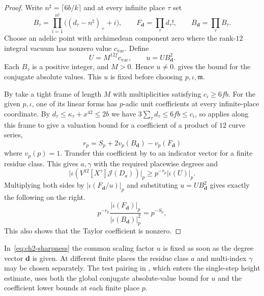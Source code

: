 \begin{proof}
Write $n^\sharp=\lceil6b/k\rceil$ and at every infinite place $\tau$ set
\[
 B_\tau=\prod_{i=1}^{n^\sharp}\bigl((d_\tau-n^\sharp)_++i\bigr),
 \qquad
 F_{\boldsymbol d}=\prod_\tau d_\tau!,
 \qquad B_{\boldsymbol d}=\prod_\tau B_\tau .
\]
Choose an adelic point with archimedean component zero where the rank-$12$ integral vacuum has nonzero value $c_{\mathrm{vac}}$. Define
\[
 U=M^{12f}c_{\mathrm{vac}},\qquad u=U B_{\boldsymbol d}^2 .
\]
Each $B_\tau$ is a positive integer, and $M>0$. Hence $u\ne0$.  gives the bound for the conjugate absolute values. This $u$ is fixed before choosing $p,\iota,\mathfrak m$.

By  take a tight frame of length $M$ with multiplicities satisfying $c_i\ge6fb$. For the given $p,\iota$, one of its linear forms has $p$-adic unit coefficients at every infinite-place coordinate. By $d_\tau\le\kappa_\tau+x^{42}\le2b$ we have $3\sum_\tau d_\tau\le6fb\le c_i$, so  applies along this frame to give a valuation bound for a coefficient of a product of $12$ curve series,
\[
 r_p=S_p+2v_p(B_{\boldsymbol d})-v_p(F_{\boldsymbol d})
\]
where $v_p(p)=1$. Transfer this coefficient by  to an indicator vector for a finite residue class. This gives $a,\gamma$ with the required placewise degrees and
\[
 \bigl|\iota(V^{12}[X^\gamma]\mathcal J(D_a))\bigr|_p
       \ge p^{-r_p}|\iota(U)|_p .
\]
Multiplying both sides by $|\iota(F_{\boldsymbol d}/u)|_p$ and substituting $u=U B_{\boldsymbol d}^2$ gives exactly the following on the right.
\[
 p^{-r_p}\frac{|\iota(F_{\boldsymbol d})|_p}
                     {|\iota(B_{\boldsymbol d})|_p^2}
 =p^{-S_p},
\]
This also shows that the Taylor coefficient is nonzero.
\end{proof}

In~\eqref{eq:ch2-sharpness} the common scaling factor $u$ is fixed as soon as the degree vector $\boldsymbol d$ is given. At different finite places the residue class $a$ and multi-index $\gamma$ may be chosen separately. The test pairing in , which enters the single-step height estimate, uses both the global conjugate absolute-value bound for $u$ and the coefficient lower bounds at each finite place $p$.
